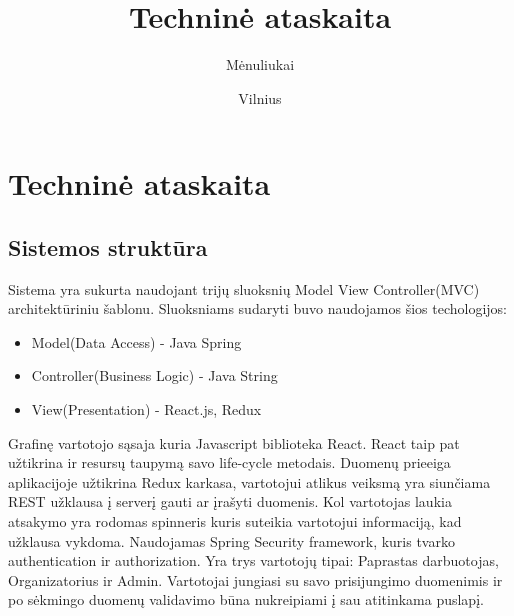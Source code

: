 \documentclass{VUMIFInfKursinis}
\title{Techninė ataskaita}
\author{Mėnuliukai}
\date{Vilnius \\ \the\year}
\begin{document}
\maketitle

\section{Techninė ataskaita}
\subsection{Sistemos struktūra}
Sistema yra sukurta naudojant trijų sluoksnių Model View Controller(MVC) architektūriniu šablonu. Sluoksniams sudaryti buvo naudojamos šios techologijos:
\begin{itemize}
	\item{Model(Data Access) -  Java Spring}
	\item{Controller(Business Logic) - Java String}
	\item{View(Presentation) - React.js, Redux}
\end{itemize}  

Grafinę vartotojo sąsaja kuria Javascript biblioteka React. React taip pat užtikrina ir resursų taupymą savo life-cycle metodais. Duomenų prieeiga aplikacijoje užtikrina Redux karkasa, vartotojui atlikus veiksmą yra siunčiama REST užklausa į serverį gauti ar įrašyti duomenis. Kol vartotojas laukia atsakymo yra rodomas spinneris kuris suteikia vartotojui informaciją, kad užklausa vykdoma. Naudojamas Spring Security framework, kuris tvarko authentication ir authorization. Yra trys vartotojų tipai: Paprastas darbuotojas, Organizatorius ir Admin. Vartotojai jungiasi su savo prisijungimo duomenimis ir po sėkmingo duomenų validavimo būna nukreipiami į sau atitinkama puslapį.
\end{document}
